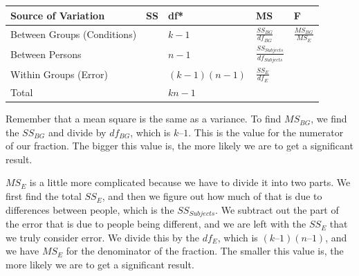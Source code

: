 \documentclass[
  letterpaper,
  DIV=11,
  numbers=noendperiod]{scrreprt}
\begin{document}
\begin{longtable}[]{@{}
  >{\raggedright\arraybackslash}p{}
  >{\raggedright\arraybackslash}p{}
  >{\raggedright\arraybackslash}p{}
  >{\raggedright\arraybackslash}p{}
  >{\raggedright\arraybackslash}p{}@{}}
\toprule\noalign{}
\begin{minipage}[b]{\linewidth}\raggedright
Source of Variation
\end{minipage} & \begin{minipage}[b]{\linewidth}\raggedright
SS
\end{minipage} & \begin{minipage}[b]{\linewidth}\raggedright
df*
\end{minipage} & \begin{minipage}[b]{\linewidth}\raggedright
MS
\end{minipage} & \begin{minipage}[b]{\linewidth}\raggedright
F
\end{minipage} \\
\midrule\noalign{}
\endhead
\bottomrule\noalign{}
\endlastfoot
Between Groups (Conditions) & & \(k - 1\) & \(\frac{SS_{BG}}{df_{BG}}\)
& \(\frac{MS_{BG}}{MS_E}\) \\
Between Persons & & \(n - 1\) & \(\frac{SS_{Subjects}}{df_{Subjects}}\)
& \\
Within Groups (Error) & & \((k - 1)(n - 1)\) & \(\frac{SS_E}{df_E}\)
& \\
Total & & \(kn - 1\) & & \\
\end{longtable}

Remember that a mean square is the same as a variance. To find
\(MS_{BG}\), we find the \(SS_{BG}\) and divide by \(df_{BG}\), which is
\(k – 1\). This is the value for the numerator of our fraction. The
bigger this value is, the more likely we are to get a significant
result.

\(MS_E\) is a little more complicated because we have to divide it into
two parts. We first find the total \(SS_E\), and then we figure out how
much of that is due to differences between people, which is the
\(SS_{Subjects}\). We subtract out the part of the error that is due to
people being different, and we are left with the \(SS_E\) that we truly
consider error. We divide this by the \(df_E\), which is
\((k – 1)(n – 1)\), and we have \(MS_E\) for the denominator of the
fraction. The smaller this value is, the more likely we are to get a
significant result.
\end{document}
